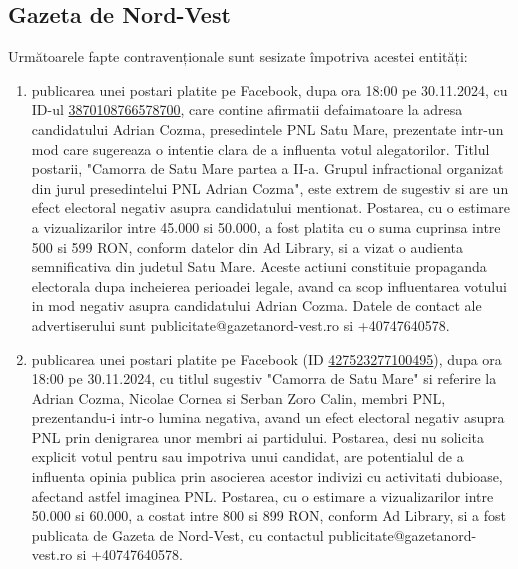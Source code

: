 \documentclass[a4paper,12pt]{article}
\begin{document}
\vspace{0.5cm}

\subsection{Gazeta de Nord-Vest}
Următoarele fapte contravenționale sunt sesizate împotriva acestei entități:

\begin{enumerate}[leftmargin=*, label=\arabic*.)]
    \item publicarea unei postari platite pe Facebook, dupa ora 18:00 pe 30.11.2024, cu ID-ul \href{https://www.facebook.com/ads/library/?id=3870108766578700}{3870108766578700}, care contine afirmatii defaimatoare la adresa candidatului Adrian Cozma, presedintele PNL Satu Mare, prezentate intr-un mod care sugereaza o intentie clara de a influenta votul alegatorilor.  Titlul postarii, "Camorra de Satu Mare partea a II-a. Grupul infractional organizat din jurul presedintelui PNL Adrian Cozma", este extrem de sugestiv si are un efect electoral negativ asupra candidatului mentionat.  Postarea, cu o estimare a vizualizarilor intre 45.000 si 50.000, a fost platita cu o suma cuprinsa intre 500 si 599 RON, conform datelor din Ad Library, si a vizat o audienta semnificativa din judetul Satu Mare.  Aceste actiuni constituie propaganda electorala dupa incheierea perioadei legale, avand ca scop influentarea votului in mod negativ asupra candidatului Adrian Cozma.  Datele de contact ale advertiserului sunt publicitate@gazetanord-vest.ro si +40747640578.
    \item publicarea unei postari platite pe Facebook (ID \href{https://www.facebook.com/ads/library/?id=427523277100495}{427523277100495}), dupa ora 18:00 pe 30.11.2024, cu titlul sugestiv "Camorra de Satu Mare" si referire la Adrian Cozma, Nicolae Cornea si Serban Zoro Calin, membri PNL, prezentandu-i intr-o lumina negativa,  avand un efect electoral negativ asupra PNL prin denigrarea unor membri ai partidului.  Postarea, desi nu solicita explicit votul pentru sau impotriva unui candidat, are potentialul de a influenta opinia publica prin asocierea acestor indivizi cu activitati dubioase, afectand astfel imaginea PNL.  Postarea, cu o estimare a vizualizarilor intre 50.000 si 60.000, a costat intre 800 si 899 RON, conform Ad Library, si a fost publicata de Gazeta de Nord-Vest, cu contactul publicitate@gazetanord-vest.ro si +40747640578.
\end{enumerate}

\vspace{0.5cm}
\end{document}
